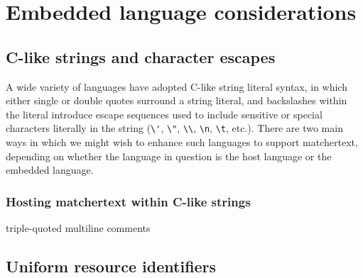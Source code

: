 \section{Embedded language considerations}
\label{sec:embed}

\subsection{C-like strings and character escapes}

A wide variety of languages have adopted C-like string literal syntax,
in which either single or double quotes surround a string literal,
and backslashes within the literal introduce escape sequences
used to include sensitive or special characters literally in the string
(\eg \verb|\'|, \verb|\"|, \verb|\\|, \verb|\n|, \verb|\t|, etc.).
There are two main ways in which we might wish to enhance such languages
to support matchertext,
depending on whether the language in question is the host language
or the embedded language.

\subsubsection{Hosting matchertext within C-like strings}


triple-quoted multiline comments


\subsection{Uniform resource identifiers}
\label{sec:embed:uri}

